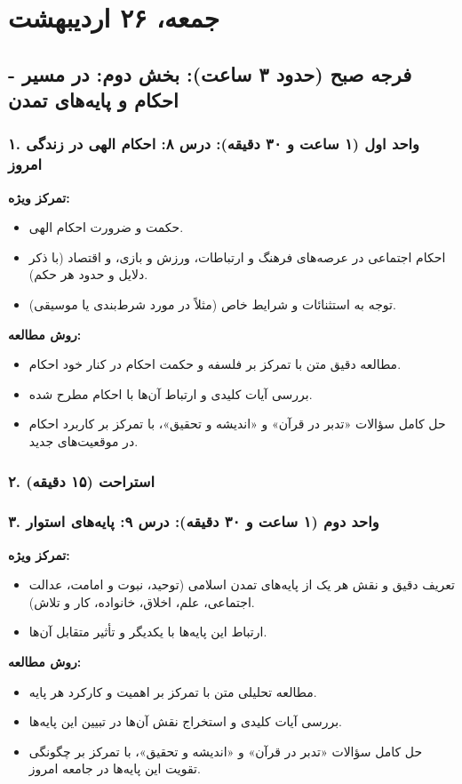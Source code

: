 \documentclass[12pt,a4paper]{article}
\begin{document}
\hrulefill
\section*{جمعه، ۲۶ اردیبهشت}

\subsection*{فرجه صبح (حدود ۳ ساعت): بخش دوم: در مسیر - احکام و پایه‌های تمدن}

\subsubsection*{۱. واحد اول (۱ ساعت و ۳۰ دقیقه): درس ۸: احکام الهی در زندگی امروز}
\textbf{تمرکز ویژه:}
\begin{itemize}
    \item حکمت و ضرورت احکام الهی.
    \item احکام اجتماعی در عرصه‌های فرهنگ و ارتباطات، ورزش و بازی، و اقتصاد (با ذکر دلایل و حدود هر حکم).
    \item توجه به استثنائات و شرایط خاص (مثلاً در مورد شرط‌بندی یا موسیقی).
\end{itemize}
\textbf{روش مطالعه:}
\begin{itemize}
    \item مطالعه دقیق متن با تمرکز بر فلسفه و حکمت احکام در کنار خود احکام.
    \item بررسی آیات کلیدی و ارتباط آن‌ها با احکام مطرح شده.
    \item حل کامل سؤالات «تدبر در قرآن» و «اندیشه و تحقیق»، با تمرکز بر کاربرد احکام در موقعیت‌های جدید.
\end{itemize}

\subsubsection*{۲. استراحت (۱۵ دقیقه)}

\subsubsection*{۳. واحد دوم (۱ ساعت و ۳۰ دقیقه): درس ۹: پایه‌های استوار}
\textbf{تمرکز ویژه:}
\begin{itemize}
    \item تعریف دقیق و نقش هر یک از پایه‌های تمدن اسلامی (توحید، نبوت و امامت، عدالت اجتماعی، علم، اخلاق، خانواده، کار و تلاش).
    \item ارتباط این پایه‌ها با یکدیگر و تأثیر متقابل آن‌ها.
\end{itemize}
\textbf{روش مطالعه:}
\begin{itemize}
    \item مطالعه تحلیلی متن با تمرکز بر اهمیت و کارکرد هر پایه.
    \item بررسی آیات کلیدی و استخراج نقش آن‌ها در تبیین این پایه‌ها.
    \item حل کامل سؤالات «تدبر در قرآن» و «اندیشه و تحقیق»، با تمرکز بر چگونگی تقویت این پایه‌ها در جامعه امروز.
\end{itemize}
\end{document}
